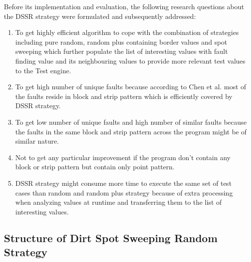 \documentclass[10pt, conference, compsocconf]{IEEEtran}
\begin{document}
Before its implementation and evaluation, the following research questions about the DSSR strategy were formulated and subsequently addressed:\\
\begin{enumerate}

\item To get highly efficient algorithm to cope with the combination of strategies including pure random, random plus containing border values and spot sweeping which further populate the list of interesting values with fault finding value and its neighbouring values to provide more relevant test values to the Test engine. \\

\item To get high number of unique faults because according to Chen et al. \cite{Chen2006} most of the faults reside in block and strip pattern which is efficiently covered by DSSR strategy. \\

\item To get  low number of unique faults and high number of similar faults because the faults in the same block and strip pattern across the program might be of similar nature.\\

\item  Not to get any particular improvement if the program don't contain any block or strip pattern but contain only point pattern.\\

\item  DSSR strategy might consume more time to execute the same set of test cases than random and random plus strategy because of extra processing when analyzing values at runtime and transferring them to the list of interesting values.\\



\end{enumerate}

\subsection{Structure of Dirt Spot Sweeping Random Strategy}
\end{document}
